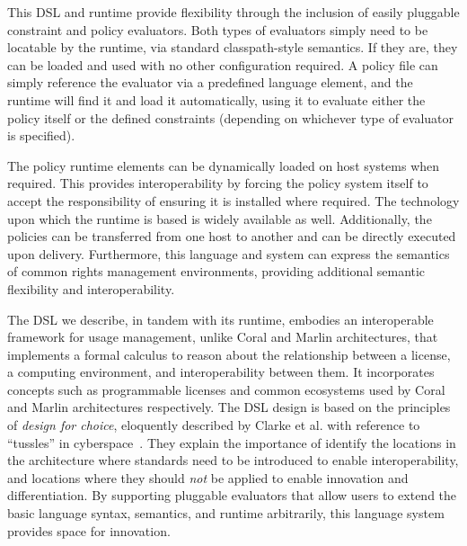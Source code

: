 This DSL and runtime provide flexibility through the inclusion of easily pluggable constraint and policy evaluators.  Both types of evaluators simply need to be locatable by the runtime, via standard classpath-style semantics.  If they are, they can be loaded and used with no other configuration required.  A policy file can simply reference the evaluator via a predefined language element, and the runtime will find it and load it automatically, using it to evaluate either the policy itself or the defined constraints (depending on whichever type of evaluator is specified).

The policy runtime elements can be dynamically loaded on host systems when required.  This provides interoperability by forcing the policy system itself to accept the responsibility of ensuring it is installed where required.  The technology upon which the runtime is based is widely available as well.  Additionally, the policies can be transferred from one host to another and can be directly executed upon delivery.  Furthermore, this language and system can express the semantics of common rights management environments, providing additional semantic flexibility and interoperability.

The DSL we describe, in tandem with its runtime, embodies an interoperable framework for usage management, unlike Coral and Marlin architectures, that implements a formal calculus to reason about the relationship between a license, a computing environment, and interoperability between them. It incorporates concepts such as programmable licenses and common ecosystems used by Coral and Marlin architectures respectively. The DSL design is based on the principles of {\em design for choice}, eloquently described by Clarke et al. with reference to ``tussles'' in cyberspace~\cite{ClWrSoBr:02}. They explain the importance of identify the locations in the architecture where standards need to be introduced to enable interoperability, and locations where they should {\em not} be applied to enable innovation and differentiation.  By supporting pluggable evaluators that allow users to extend the basic language syntax, semantics, and runtime arbitrarily, this language system provides space for innovation.

